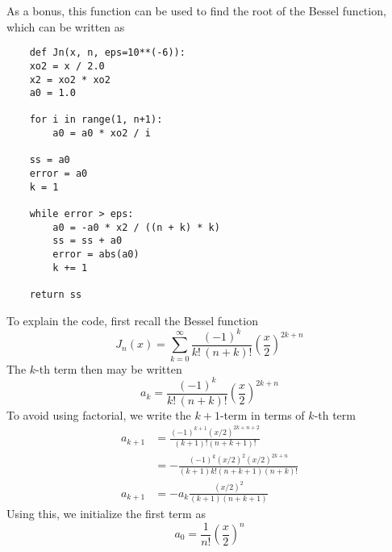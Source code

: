 \documentclass[../../../main.tex]{subfiles}
\begin{document}
As a bonus, this function can be used to find the root of the Bessel function, which can be written as
\begin{verbatim}
    def Jn(x, n, eps=10**(-6)):
    xo2 = x / 2.0
    x2 = xo2 * xo2
    a0 = 1.0

    for i in range(1, n+1):
        a0 = a0 * xo2 / i
    
    ss = a0
    error = a0
    k = 1
    
    while error > eps:
        a0 = -a0 * x2 / ((n + k) * k)
        ss = ss + a0
        error = abs(a0)
        k += 1
    
    return ss
\end{verbatim}
To explain the code, first recall the Bessel function
\begin{equation*}
    J_n(x) = \sum_{k=0}^{\infty} \frac{(-1)^k}{k! \, (n+k)!} \left( \frac{x}{2} \right)^{2k+n}
\end{equation*}
The $k$-th term then may be written
\begin{equation*}
    a_k = \frac{(-1)^k}{k! \, (n+k)!} \left( \frac{x}{2} \right)^{2k+n}
\end{equation*}
To avoid using factorial, we write the $k+1$-term in terms of $k$-th term
\begin{align*}
    a_{k+1} & = \frac{(-1)^{k+1}(x/2)^{2k+n+2}}{(k+1)!(n+k+1)!}          \\
            & = -\frac{(-1)^k(x/2)^2(x/2)^{2k+n }}{(k+1)k!(n+k+1)(n+k)!} \\
    a_{k+1} & = -a_k\frac{(x/2)^2}{(k+1)(n+k+1)}
\end{align*}
Using this, we initialize the first term as
\begin{equation*}
    a_0=\frac{1 }{n!}\left( \frac{x }{2 } \right) ^n
\end{equation*}
\end{document}
